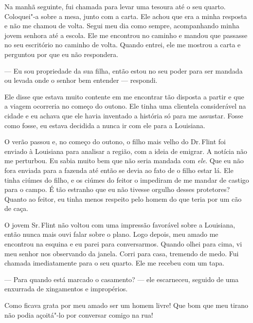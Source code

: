 Na manhã seguinte, fui chamada para
levar uma tesoura até o seu quarto. Coloquei"-a sobre a mesa, junto com a
carta. Ele achou que era a minha resposta e não me chamou de volta.
Segui meu dia como sempre, acompanhando minha jovem senhora até a
escola. Ele me encontrou no caminho e mandou que passasse no seu
escritório no caminho de volta. Quando entrei, ele me mostrou a carta e
perguntou por que eu não respondera.

--- Eu sou propriedade da sua filha, então estou no seu poder para ser
mandada ou levada onde o senhor bem entender --- respondi.

Ele disse que estava muito contente em me encontrar tão disposta a
partir e que a viagem ocorreria no começo do outono. Ele tinha uma
clientela considerável na cidade e eu achava que ele havia inventado a
história só para me assustar. Fosse como fosse, eu estava decidida a
nunca ir com ele para a Louisiana.

O verão passou e, no começo do outono,
o filho mais velho do Dr.\,Flint foi enviado à Louisiana para analisar a
região, com a ideia de emigrar. A notícia não me perturbou. Eu sabia
muito bem que não seria mandada com \emph{ele}. Que eu não fora enviada
para a fazenda até então se devia ao fato de o filho estar lá. Ele tinha
ciúmes do filho, e os ciúmes do feitor o impediram de me mandar de
castigo para o campo. É tão estranho que eu não tivesse orgulho desses
protetores? Quanto ao feitor, eu tinha menos respeito pelo homem do que
teria por um cão de caça.

O jovem Sr.\,Flint não voltou com uma
impressão favorável sobre a Louisiana, então nunca mais ouvi falar sobre
o plano. Logo depois, meu amado me encontrou na esquina e eu parei para
conversarmos. Quando olhei para cima, vi meu senhor nos observando da
janela. Corri para casa, tremendo de medo. Fui chamada imediatamente
para o seu quarto. Ele me recebeu com um tapa.

--- Para quando está marcado o casamento? --- ele escarneceu, seguido de
uma enxurrada de xingamentos e impropérios.

Como ficava grata por meu amado ser um homem livre! Que bom que meu
tirano não podia açoitá"-lo por conversar comigo na rua!

